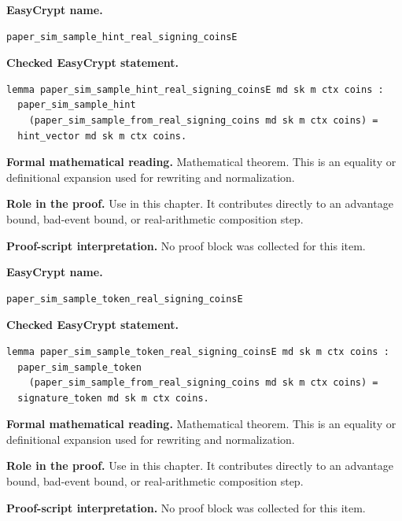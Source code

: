\begin{formaltheorem}
\noindent\textbf{EasyCrypt name.}
\begin{lstlisting}[language=EasyCrypt,basicstyle=\ttfamily\scriptsize]
paper_sim_sample_hint_real_signing_coinsE
\end{lstlisting}
\noindent\textbf{Checked EasyCrypt statement.}
\begin{lstlisting}[language=EasyCrypt,basicstyle=\ttfamily\scriptsize]
lemma paper_sim_sample_hint_real_signing_coinsE md sk m ctx coins :
  paper_sim_sample_hint
    (paper_sim_sample_from_real_signing_coins md sk m ctx coins) =
  hint_vector md sk m ctx coins.
\end{lstlisting}
\noindent\textbf{Formal mathematical reading.}
Mathematical theorem. This is an equality or definitional expansion used for rewriting and normalization.

\noindent\textbf{Role in the proof.}
Use in this chapter. It contributes directly to an advantage bound, bad-event bound, or real-arithmetic composition step.

\noindent\textbf{Proof-script interpretation.}
No proof block was collected for this item.

\end{formaltheorem}

\begin{formaltheorem}
\noindent\textbf{EasyCrypt name.}
\begin{lstlisting}[language=EasyCrypt,basicstyle=\ttfamily\scriptsize]
paper_sim_sample_token_real_signing_coinsE
\end{lstlisting}
\noindent\textbf{Checked EasyCrypt statement.}
\begin{lstlisting}[language=EasyCrypt,basicstyle=\ttfamily\scriptsize]
lemma paper_sim_sample_token_real_signing_coinsE md sk m ctx coins :
  paper_sim_sample_token
    (paper_sim_sample_from_real_signing_coins md sk m ctx coins) =
  signature_token md sk m ctx coins.
\end{lstlisting}
\noindent\textbf{Formal mathematical reading.}
Mathematical theorem. This is an equality or definitional expansion used for rewriting and normalization.

\noindent\textbf{Role in the proof.}
Use in this chapter. It contributes directly to an advantage bound, bad-event bound, or real-arithmetic composition step.

\noindent\textbf{Proof-script interpretation.}
No proof block was collected for this item.

\end{formaltheorem}

